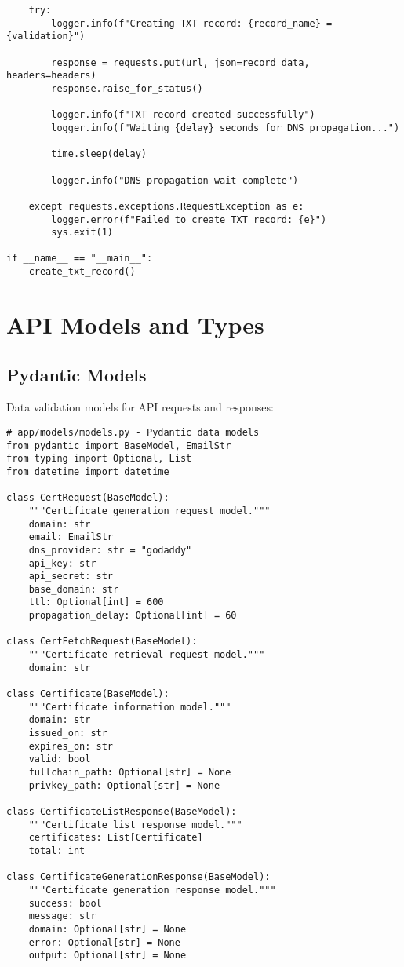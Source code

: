 \begin{verbatim}
    try:
        logger.info(f"Creating TXT record: {record_name} = {validation}")
        
        response = requests.put(url, json=record_data, headers=headers)
        response.raise_for_status()
        
        logger.info(f"TXT record created successfully")
        logger.info(f"Waiting {delay} seconds for DNS propagation...")
        
        time.sleep(delay)
        
        logger.info("DNS propagation wait complete")
        
    except requests.exceptions.RequestException as e:
        logger.error(f"Failed to create TXT record: {e}")
        sys.exit(1)

if __name__ == "__main__":
    create_txt_record()
\end{verbatim}

\section{API Models and Types}

\subsection{Pydantic Models}

Data validation models for API requests and responses:

\begin{verbatim}
# app/models/models.py - Pydantic data models
from pydantic import BaseModel, EmailStr
from typing import Optional, List
from datetime import datetime

class CertRequest(BaseModel):
    """Certificate generation request model."""
    domain: str
    email: EmailStr
    dns_provider: str = "godaddy"
    api_key: str
    api_secret: str
    base_domain: str
    ttl: Optional[int] = 600
    propagation_delay: Optional[int] = 60

class CertFetchRequest(BaseModel):
    """Certificate retrieval request model."""
    domain: str

class Certificate(BaseModel):
    """Certificate information model."""
    domain: str
    issued_on: str
    expires_on: str
    valid: bool
    fullchain_path: Optional[str] = None
    privkey_path: Optional[str] = None

class CertificateListResponse(BaseModel):
    """Certificate list response model."""
    certificates: List[Certificate]
    total: int

class CertificateGenerationResponse(BaseModel):
    """Certificate generation response model."""
    success: bool
    message: str
    domain: Optional[str] = None
    error: Optional[str] = None
    output: Optional[str] = None
\end{verbatim}

